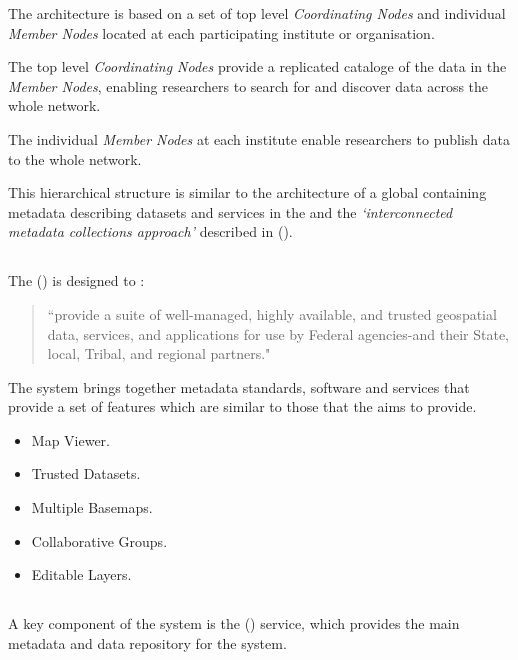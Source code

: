 \documentclass{article}
\begin{document}
The \cite{data-one} architecture is based on a set of top level
\textit{Coordinating Nodes} and individual \textit{Member Nodes} located
at each participating institute or organisation.

The top level \textit{Coordinating Nodes} provide a replicated cataloge of
the data in the \textit{Member Nodes}, enabling researchers to search for
and discover data across the whole network.

The individual \textit{Member Nodes} at each institute enable researchers
to publish data to the whole \cite{data-one} network.

This hierarchical structure is similar to the \cite{vo} architecture of a global
\cite{ivoa-reg} containing metadata describing datasets and services in the
\cite{vo} and the \textit{`interconnected metadata collections approach'}
described in  (\cite{jones-2006}).

\subsection{}

The  (\cite{fgdc})  is designed to :

\begin{quote}
``provide a suite of well-managed, highly available, and trusted geospatial 
data, services, and applications for use by Federal agencies-and their State,
local, Tribal, and regional partners."
\end{quote}

The \cite{fgdc-geo} system brings together metadata standards, software
and services that provide a set of features which are similar to those that
the \cite{atrop} aims to provide.

\begin{itemize}
    \item Map Viewer.
    \item Trusted Datasets.
    \item Multiple Basemaps.
    \item Collaborative Groups.
    \item Editable Layers.
\end{itemize}

\subsection{}

A key component of the  system is the 
(\cite{ckan}) service, which provides the main metadata and data repository
for the system.
\end{document}
